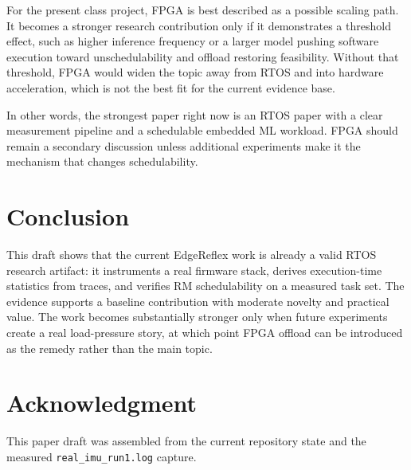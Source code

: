 \documentclass[journal]{IEEEtran}
\begin{document}
For the present class project, FPGA is best described as a possible scaling path. It becomes a stronger research contribution only if it demonstrates a threshold effect, such as higher inference frequency or a larger model pushing software execution toward unschedulability and offload restoring feasibility. Without that threshold, FPGA would widen the topic away from RTOS and into hardware acceleration, which is not the best fit for the current evidence base.

In other words, the strongest paper right now is an RTOS paper with a clear measurement pipeline and a schedulable embedded ML workload. FPGA should remain a secondary discussion unless additional experiments make it the mechanism that changes schedulability.

\section{Conclusion}
This draft shows that the current EdgeReflex work is already a valid RTOS research artifact: it instruments a real firmware stack, derives execution-time statistics from traces, and verifies RM schedulability on a measured task set. The evidence supports a baseline contribution with moderate novelty and practical value. The work becomes substantially stronger only when future experiments create a real load-pressure story, at which point FPGA offload can be introduced as the remedy rather than the main topic.

\section*{Acknowledgment}
This paper draft was assembled from the current repository state and the measured \texttt{real\_imu\_run1.log} capture.



\end{document}
